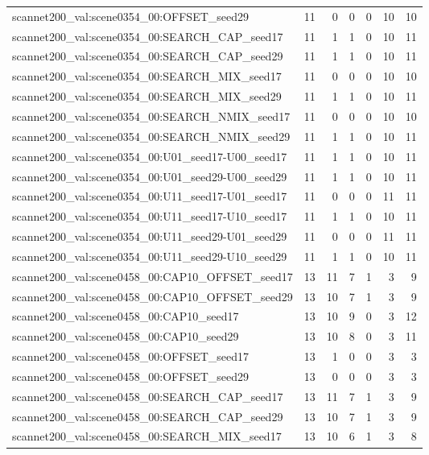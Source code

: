 \begin{table}[t]
\begin{tabular}{lrrrrrr}
scannet200\_val:scene0354\_00:OFFSET\_seed29 & 11 & 0 & 0 & 0 & 10 & 10 \\
scannet200\_val:scene0354\_00:SEARCH\_CAP\_seed17 & 11 & 1 & 1 & 0 & 10 & 11 \\
scannet200\_val:scene0354\_00:SEARCH\_CAP\_seed29 & 11 & 1 & 1 & 0 & 10 & 11 \\
scannet200\_val:scene0354\_00:SEARCH\_MIX\_seed17 & 11 & 0 & 0 & 0 & 10 & 10 \\
scannet200\_val:scene0354\_00:SEARCH\_MIX\_seed29 & 11 & 1 & 1 & 0 & 10 & 11 \\
scannet200\_val:scene0354\_00:SEARCH\_NMIX\_seed17 & 11 & 0 & 0 & 0 & 10 & 10 \\
scannet200\_val:scene0354\_00:SEARCH\_NMIX\_seed29 & 11 & 1 & 1 & 0 & 10 & 11 \\
scannet200\_val:scene0354\_00:U01\_seed17-U00\_seed17 & 11 & 1 & 1 & 0 & 10 & 11 \\
scannet200\_val:scene0354\_00:U01\_seed29-U00\_seed29 & 11 & 1 & 1 & 0 & 10 & 11 \\
scannet200\_val:scene0354\_00:U11\_seed17-U01\_seed17 & 11 & 0 & 0 & 0 & 11 & 11 \\
scannet200\_val:scene0354\_00:U11\_seed17-U10\_seed17 & 11 & 1 & 1 & 0 & 10 & 11 \\
scannet200\_val:scene0354\_00:U11\_seed29-U01\_seed29 & 11 & 0 & 0 & 0 & 11 & 11 \\
scannet200\_val:scene0354\_00:U11\_seed29-U10\_seed29 & 11 & 1 & 1 & 0 & 10 & 11 \\
scannet200\_val:scene0458\_00:CAP10\_OFFSET\_seed17 & 13 & 11 & 7 & 1 & 3 & 9 \\
scannet200\_val:scene0458\_00:CAP10\_OFFSET\_seed29 & 13 & 10 & 7 & 1 & 3 & 9 \\
scannet200\_val:scene0458\_00:CAP10\_seed17 & 13 & 10 & 9 & 0 & 3 & 12 \\
scannet200\_val:scene0458\_00:CAP10\_seed29 & 13 & 10 & 8 & 0 & 3 & 11 \\
scannet200\_val:scene0458\_00:OFFSET\_seed17 & 13 & 1 & 0 & 0 & 3 & 3 \\
scannet200\_val:scene0458\_00:OFFSET\_seed29 & 13 & 0 & 0 & 0 & 3 & 3 \\
scannet200\_val:scene0458\_00:SEARCH\_CAP\_seed17 & 13 & 11 & 7 & 1 & 3 & 9 \\
scannet200\_val:scene0458\_00:SEARCH\_CAP\_seed29 & 13 & 10 & 7 & 1 & 3 & 9 \\
scannet200\_val:scene0458\_00:SEARCH\_MIX\_seed17 & 13 & 10 & 6 & 1 & 3 & 8 \\

\end{tabular}
\end{table}
